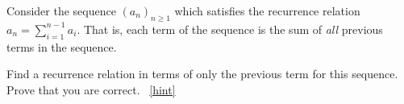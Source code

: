 \documentclass{book}
\begin{document}
\setcounter{project}{142}
\addtocounter{project}{-1}
\begin{activity}[]\label{activity-135}
\hypertarget{p-970}{}%
Consider the sequence \((a_n)_{n \ge 1}\) which satisfies the recurrence relation \(a_n = \sum_{i = 1}^{n-1} a_i\).  That is, each term of the sequence is the sum of \emph{all} previous terms in the sequence.%
\par
\hypertarget{p-971}{}%
Find a recurrence relation in terms of only the previous term for this sequence.  Prove that you are correct.%
~\hfill{\tiny\hyperlink{a-142}{[hint]}\hypertarget{q-142}{}}\end{activity}
\end{document}
